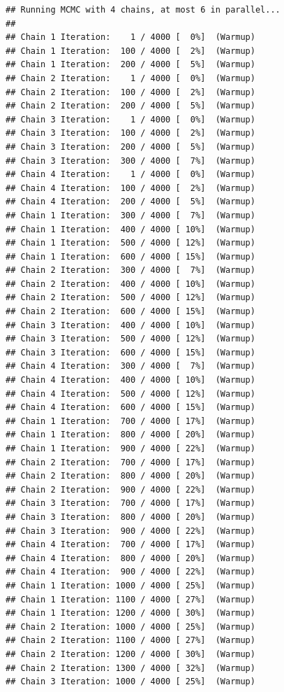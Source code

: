 \documentclass[
]{article}
\begin{document}
\begin{verbatim}
## Running MCMC with 4 chains, at most 6 in parallel...
## 
## Chain 1 Iteration:    1 / 4000 [  0%]  (Warmup) 
## Chain 1 Iteration:  100 / 4000 [  2%]  (Warmup) 
## Chain 1 Iteration:  200 / 4000 [  5%]  (Warmup) 
## Chain 2 Iteration:    1 / 4000 [  0%]  (Warmup) 
## Chain 2 Iteration:  100 / 4000 [  2%]  (Warmup) 
## Chain 2 Iteration:  200 / 4000 [  5%]  (Warmup) 
## Chain 3 Iteration:    1 / 4000 [  0%]  (Warmup) 
## Chain 3 Iteration:  100 / 4000 [  2%]  (Warmup) 
## Chain 3 Iteration:  200 / 4000 [  5%]  (Warmup) 
## Chain 3 Iteration:  300 / 4000 [  7%]  (Warmup) 
## Chain 4 Iteration:    1 / 4000 [  0%]  (Warmup) 
## Chain 4 Iteration:  100 / 4000 [  2%]  (Warmup) 
## Chain 4 Iteration:  200 / 4000 [  5%]  (Warmup) 
## Chain 1 Iteration:  300 / 4000 [  7%]  (Warmup) 
## Chain 1 Iteration:  400 / 4000 [ 10%]  (Warmup) 
## Chain 1 Iteration:  500 / 4000 [ 12%]  (Warmup) 
## Chain 1 Iteration:  600 / 4000 [ 15%]  (Warmup) 
## Chain 2 Iteration:  300 / 4000 [  7%]  (Warmup) 
## Chain 2 Iteration:  400 / 4000 [ 10%]  (Warmup) 
## Chain 2 Iteration:  500 / 4000 [ 12%]  (Warmup) 
## Chain 2 Iteration:  600 / 4000 [ 15%]  (Warmup) 
## Chain 3 Iteration:  400 / 4000 [ 10%]  (Warmup) 
## Chain 3 Iteration:  500 / 4000 [ 12%]  (Warmup) 
## Chain 3 Iteration:  600 / 4000 [ 15%]  (Warmup) 
## Chain 4 Iteration:  300 / 4000 [  7%]  (Warmup) 
## Chain 4 Iteration:  400 / 4000 [ 10%]  (Warmup) 
## Chain 4 Iteration:  500 / 4000 [ 12%]  (Warmup) 
## Chain 4 Iteration:  600 / 4000 [ 15%]  (Warmup) 
## Chain 1 Iteration:  700 / 4000 [ 17%]  (Warmup) 
## Chain 1 Iteration:  800 / 4000 [ 20%]  (Warmup) 
## Chain 1 Iteration:  900 / 4000 [ 22%]  (Warmup) 
## Chain 2 Iteration:  700 / 4000 [ 17%]  (Warmup) 
## Chain 2 Iteration:  800 / 4000 [ 20%]  (Warmup) 
## Chain 2 Iteration:  900 / 4000 [ 22%]  (Warmup) 
## Chain 3 Iteration:  700 / 4000 [ 17%]  (Warmup) 
## Chain 3 Iteration:  800 / 4000 [ 20%]  (Warmup) 
## Chain 3 Iteration:  900 / 4000 [ 22%]  (Warmup) 
## Chain 4 Iteration:  700 / 4000 [ 17%]  (Warmup) 
## Chain 4 Iteration:  800 / 4000 [ 20%]  (Warmup) 
## Chain 4 Iteration:  900 / 4000 [ 22%]  (Warmup) 
## Chain 1 Iteration: 1000 / 4000 [ 25%]  (Warmup) 
## Chain 1 Iteration: 1100 / 4000 [ 27%]  (Warmup) 
## Chain 1 Iteration: 1200 / 4000 [ 30%]  (Warmup) 
## Chain 2 Iteration: 1000 / 4000 [ 25%]  (Warmup) 
## Chain 2 Iteration: 1100 / 4000 [ 27%]  (Warmup) 
## Chain 2 Iteration: 1200 / 4000 [ 30%]  (Warmup) 
## Chain 2 Iteration: 1300 / 4000 [ 32%]  (Warmup) 
## Chain 3 Iteration: 1000 / 4000 [ 25%]  (Warmup) 

\end{verbatim}
\end{document}
